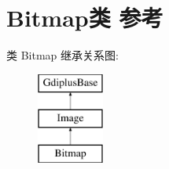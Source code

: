 \hypertarget{class_bitmap}{}\section{Bitmap类 参考}
\label{class_bitmap}
类 Bitmap 继承关系图\+:\begin{figure}[H]
\begin{center}
\leavevmode
\includegraphics[height=3.000000cm]{class_bitmap}
\end{center}
\end{figure}
